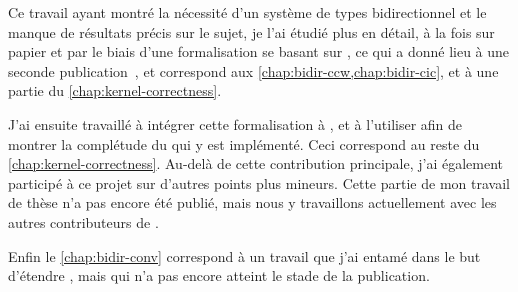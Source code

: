 Ce travail ayant montré la nécessité d’un système de types bidirectionnel
et le manque de résultats précis sur le sujet, je l’ai
étudié plus en détail, à la fois sur papier et par le biais d’une
formalisation se basant sur ,
ce qui a donné lieu à une seconde publication~,
et correspond aux \cref{chap:bidir-ccw,chap:bidir-cic}, et à une partie du
\cref{chap:kernel-correctness}.

J’ai ensuite travaillé à intégrer cette formalisation à
, et à l’utiliser afin de montrer la complétude du 
qui y est implémenté. Ceci correspond au reste du \cref{chap:kernel-correctness}.
Au-delà de cette contribution principale,
j’ai également participé à ce projet sur d’autres points plus mineurs.
Cette partie de mon travail de thèse n’a pas encore été publié, mais nous y
travaillons actuellement avec les autres contributeurs de .

Enfin le \cref{chap:bidir-conv} correspond à un travail que j’ai entamé dans
le but d’étendre , mais qui n’a pas encore atteint le stade de la
publication.